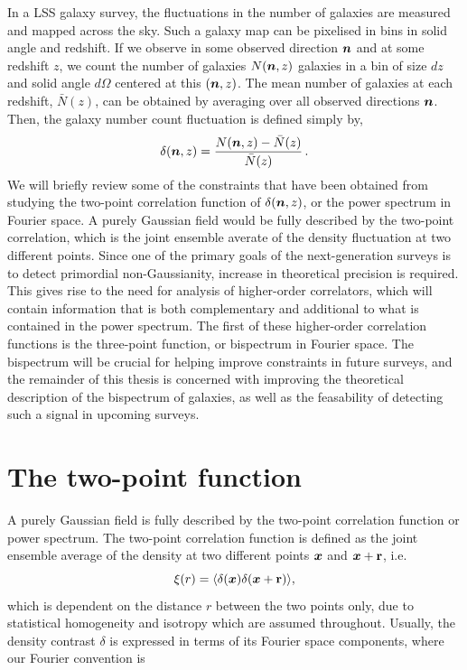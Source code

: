 In a LSS galaxy survey, the fluctuations in the number of galaxies are measured and mapped across the sky. Such a galaxy map can be pixelised in bins in solid angle and redshift. If we observe in some observed direction $\bm {n}$ and at some redshift $z$, we count the number of galaxies $N(\bm {n},z)$ galaxies in a bin of size $dz$ and solid angle $d\Omega$ centered at this $(\bm {n},z)$. The mean number of galaxies at each redshift, $\bar{N}(z)$, can be obtained by averaging over all observed directions $\bm {n}$. Then, the galaxy number count fluctuation is defined simply by, 
\begin{equation}
	\delta(\bm {n},z) = \frac{N(\bm {n},z) - \bar{N}(z)}{\bar{N}(z)}\,.
\end{equation}
We will briefly review some of the constraints that have been obtained from studying the two-point correlation function of $\delta(\bm {n},z)$, or the power spectrum in Fourier space. A purely Gaussian field would be fully described by the two-point correlation, which is the joint ensemble averate of the density fluctuation at two different points. Since one of the primary goals of the next-generation surveys is to detect primordial non-Gaussianity, increase in theoretical precision is required. This gives rise to the need for analysis of higher-order correlators, which will contain information that is both complementary and additional to what is contained in the power spectrum. The first of these higher-order correlation functions is the three-point function, or bispectrum in Fourier space. The bispectrum will be crucial for helping improve constraints in future surveys, and the remainder of this thesis is concerned with improving the theoretical description of the bispectrum of galaxies, as well as the feasability of detecting such a signal in upcoming surveys.

\section{The two-point function}

A purely Gaussian field is fully described by the two-point correlation function or power spectrum. The two-point correlation function is defined as the joint ensemble average of the density at two different points $\bm {x}$ and $\bm {x} + \textbf{r}$, i.e. 
\begin{equation}
	\xi(r) = \langle \delta(\bm {x}) \delta(\bm {x} + \textbf{r}) \rangle,
\end{equation}
which is dependent on the distance $r$ between the two points only, due to statistical homogeneity and isotropy which are assumed throughout. Usually, the density contrast $\delta$ is expressed in terms of its Fourier space components, where our Fourier convention is 

